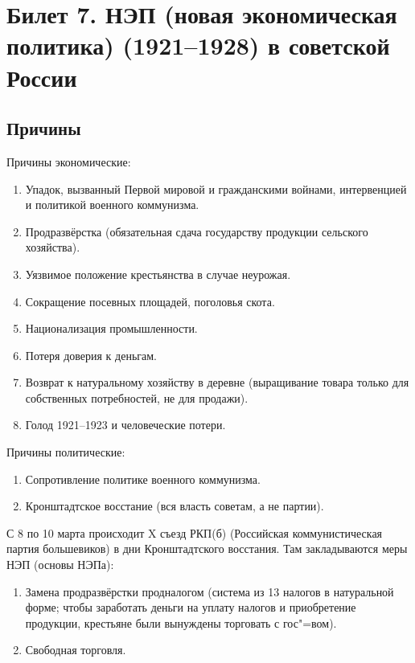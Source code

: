 \section{Билет 7. НЭП (новая экономическая политика) (1921--1928) в советской России}

\subsection{Причины}

Причины экономические:

\begin{enumerate}
    \item Упадок, вызванный Первой мировой и гражданскими войнами, интервенцией и политикой военного коммунизма.
    \item Продразвёрстка (обязательная сдача государству продукции сельского хозяйства).
    \item Уязвимое положение крестьянства в случае неурожая.
    \item Сокращение посевных площадей, поголовья скота.
    \item Национализация промышленности.
    \item Потеря доверия к деньгам.
    \item Возврат к натуральному хозяйству в деревне (выращивание товара только для собственных потребностей, не для продажи).
    \item Голод 1921--1923 и человеческие потери.
\end{enumerate}

\vspace{0.5cm}

Причины политические:

\begin{enumerate}
    \item Сопротивление политике военного коммунизма.
    \item Кронштадтское восстание (вся власть советам, а не партии). 
\end{enumerate}

\vspace{0.5cm}

С 8 по 10 марта происходит X съезд РКП(б) (Российская коммунистическая партия большевиков) в дни Кронштадтского восстания. Там закладываются меры НЭП (основы НЭПа):

\begin{enumerate}
    \item Замена продразвёрстки продналогом (система из 13 налогов в натуральной форме; чтобы заработать деньги на уплату налогов и приобретение продукции, крестьяне были вынуждены торговать с гос"=вом).
    \item Свободная торговля.
\end{enumerate}

